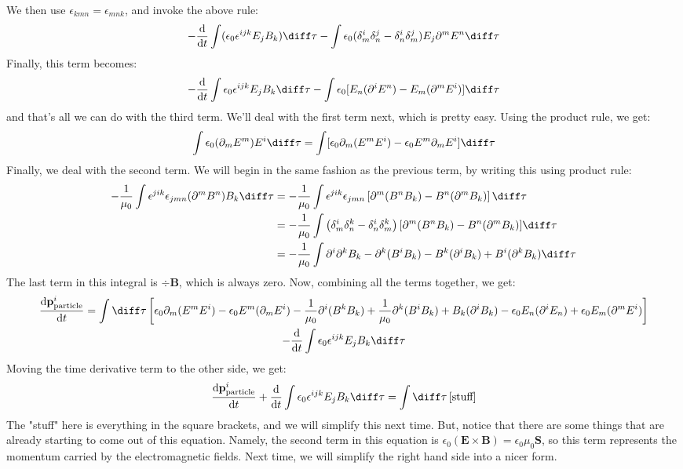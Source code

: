 We then use \( \epsilon_{kmn} = \epsilon_{mnk} \), and invoke the above rule:
\[
	-\dv{t} \int (\epsilon_0 \epsilon^{ijk} E_j B_k) \diff \tau - \int \epsilon_0 (\delta^{i}_m \delta^{j}_n
	- \delta^{i} _n \delta^{j}_m) E_j \partial^{m} E^{n} \diff \tau 
\]
Finally, this term becomes:
\[
	-\dv{t} \int \epsilon_0 \epsilon^{ijk} E_j B_k \diff \tau - \int \epsilon_0 [E_n(\partial^{i} E^{n}) -
	E_m(\partial^{m} E^{i})] \diff \tau 
\]
and that's all we can do with the third term. We'll deal with the first term next, which is pretty easy.
Using the product rule, we get:
\[
	\int \epsilon_0 (\partial_m E^{m}) E^{i} \diff \tau = \int[\epsilon_0 \partial_m (E^{m} E^{i}) -
	\epsilon_0 E^{m} \partial_m E^{i}] \diff \tau
\]
Finally, we deal with the second term. We will begin in the same fashion as the previous term, by
writing this using product rule:
\begin{align*}
	-\frac{1}{\mu_0}\int \epsilon^{jik} \epsilon_{jmn}(\partial^{m}B^{n})B_k \diff \tau &=
	-\frac{1}{\mu_0} \int \epsilon^{jik} \epsilon_{jmn} \left[ \partial^{m}(B^{n}B_k) -
	B^{n}(\partial^{m}B_k)\right] \diff \tau \\ 
	&= -\frac{1}{\mu_0} \int \left( \delta^{i}_m \delta^{k}_n - \delta^{i}_n \delta^{k}_m \right)
	[\partial^{m} (B^{n}B_k) - B^{n}(\partial^{m}B_k)] \diff \tau  \\ 
	&= -\frac{1}{\mu_0}\int \partial^{i}\partial^{k}B_k - \partial^{k}(B^{i}B_k) - B^{k}(\partial^{i} B_k) +
	B^{i}(\partial^{k}B_k) \diff \tau
\end{align*}
The last term in this integral is \( \div \mathbf{B} \), which is always zero. 
Now, combining all the terms together, we get:
\begin{multline*}
	\dv{\mathbf{p}_\text{particle}^{i}}{t} = \int \diff \tau \left[ \epsilon_0 \partial_m (E^{m}E^{i}) -
	\epsilon_0 E^{m}(\partial_m E^{i}) - \frac{1}{\mu_0} \partial^{i}(B^{k}B_k) +
\frac{1}{\mu_0}\partial^{k}(B^{i}B_k) + B_k (\partial^{i} B_k) - \epsilon_0 E_n (\partial^{i} E_n) +
\epsilon_0 E_m (\partial^{m} E^{i}) \right] \\- \dv{t} \int \epsilon_0 \epsilon^{ijk}E_j B_k \diff \tau
\end{multline*}
Moving the time derivative term to the other side, we get:
\[
	\dv{\mathbf{p}_\text{particle}^{i}}{t} + \dv{t} \int \epsilon_0 \epsilon^{ijk}E_j B_k \diff \tau = \int
	\diff \tau \left[ \text{stuff} \right]
\]
The "stuff" here is everything in the square brackets, and we will simplify this next time. But, notice that
there are some things that are already starting to come out of this equation. Namely, the second term in this
equation is \( \epsilon_0 (\mathbf{E} \times \mathbf{B}) = \epsilon_0 \mu_0 \mathbf{S} \), so this term
represents the momentum carried by the electromagnetic fields. Next time, we will simplify the right hand
side into a nicer form.    
